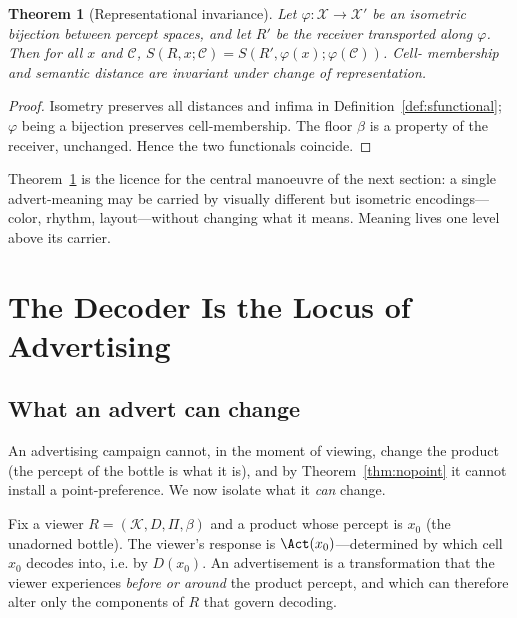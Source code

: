 \documentclass[twocolumn,11pt,a4paper]{article}
\theoremstyle{adv}
\newtheorem{theorem}{Theorem}[section]
\theoremstyle{definition}
\theoremstyle{remark}
\newcommand{\Out}{\mathcal{X}}         %
\newcommand{\Know}{\mathcal{K}}        %
\newcommand{\Cell}{\mathcal{C}}        %
\newcommand{\Dec}{D}                   %
\newcommand{\Proj}{\Pi}                %
\newcommand{\Recv}{R}                  %
\newcommand{\Sval}{S}                  %
\newcommand{\floor}{\beta}            %
\begin{document}
\begin{theorem}[Representational invariance]
\label{thm:repinv}
Let $\varphi:\Out\to\Out'$ be an isometric bijection between percept
spaces, and let $\Recv'$ be the receiver transported along $\varphi$. Then
for all $x$ and $\Cell$,
$\Sval(\Recv,x;\Cell)=\Sval(\Recv',\varphi(x);\varphi(\Cell))$. Cell-
membership and semantic distance are invariant under change of
representation.
\end{theorem}

\begin{proof}
Isometry preserves all distances and infima in
Definition~\ref{def:sfunctional}; $\varphi$ being a bijection preserves
cell-membership. The floor $\floor$ is a property of the receiver,
unchanged. Hence the two functionals coincide.
\end{proof}

Theorem~\ref{thm:repinv} is the licence for the central manoeuvre of the
next section: a single advert-meaning may be carried by visually different
but isometric encodings---color, rhythm, layout---without changing what it
means. Meaning lives one level above its carrier.

\section{The Decoder Is the Locus of Advertising}
\label{sec:decoder}

\subsection{What an advert can change}

An advertising campaign cannot, in the moment of viewing, change the
product (the percept of the bottle is what it is), and by
Theorem~\ref{thm:nopoint} it cannot install a point-preference. We now
isolate what it \emph{can} change.

Fix a viewer $\Recv=(\Know,\Dec,\Proj,\floor)$ and a product whose percept
is $x_0$ (the unadorned bottle). The viewer's response is
$\Act(x_0)$---determined by which cell $x_0$ decodes into, i.e. by
$\Dec(x_0)$. An advertisement is a transformation that the viewer
experiences \emph{before or around} the product percept, and which can
therefore alter only the components of $\Recv$ that govern decoding.
\end{document}
